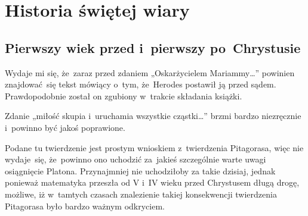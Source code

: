 \documentclass[a4paper,11pt]{article}
\begin{document}

\vspace{\spaceTwo}










\newpage
\section{Historia świętej wiary}

\vspace{\spaceTwo}



\subsection{Pierwszy wiek przed i~pierwszy po~Chrystusie}

\vspace{\spaceThree}






\start {} Wydaje mi się, że~zaraz przed zdaniem
„Oskarżycielem Mariammy\ldots” powinien znajdować~się tekst mówiący
o~tym, że~Herodes postawił ją przed sądem. Prawdopodobnie został on
zgubiony w~trakcie składania książki.

\vspace{\spaceFour}


\start {} Zdanie „miłość skupia i~uruchamia wszystkie
cząstki\ldots” brzmi bardzo niezręcznie i~powinno być jakoś
poprawione.

\vspace{\spaceFour}


\start {} Podane tu twierdzenie jest prostym wnioskiem
z~twierdzenia Pitagorasa, więc nie wydaje~się, że~powinno ono uchodzić
za~jakieś szczególnie warte uwagi osiągnięcie Platona. Przynajmniej
nie uchodziłoby za takie dzisiaj, jednak ponieważ matematyka przeszła
od V i~IV wieku przed Chrystusem długą drogę, możliwe, iż w~tamtych
czasach znalezienie takiej konsekwencji twierdzenia Pitagorasa było
bardzo ważnym odkryciem.
\end{document}
